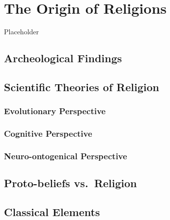 \documentclass[
]{book}
\begin{document}
\hypertarget{the-origin-of-religions}{%
\chapter{The Origin of Religions}\label{the-origin-of-religions}}

Placeholder

\hypertarget{archeological-findings}{%
\section{Archeological Findings}\label{archeological-findings}}

\hypertarget{scientific-theories-of-religion}{%
\section{Scientific Theories of Religion}\label{scientific-theories-of-religion}}

\hypertarget{evolutionary-perspective}{%
\subsection{Evolutionary Perspective}\label{evolutionary-perspective}}

\hypertarget{cognitive-perspective}{%
\subsection{Cognitive Perspective}\label{cognitive-perspective}}

\hypertarget{neuro-ontogenical-perspective}{%
\subsection{Neuro-ontogenical Perspective}\label{neuro-ontogenical-perspective}}

\hypertarget{proto-beliefs-vs.-religion}{%
\section{Proto-beliefs vs.~Religion}\label{proto-beliefs-vs.-religion}}

\hypertarget{classical-elements}{%
\section{Classical Elements}\label{classical-elements}}

  
\end{document}
